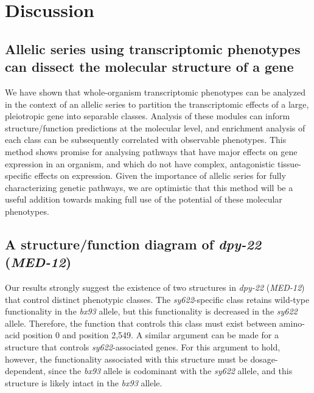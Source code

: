 \documentclass[10pt, twocolumn]{article}
\newcommand{\cel}{\emph{C.~elegans}}
\newcommand{\gene}[1]{\mbox{\emph{#1}}}
\newcommand{\dpy}{\gene{dpy-22} (\emph{MED-12})}
\begin{document}
%


\section*{Discussion}
\label{sec:conclusions}
\subsection*{Allelic series using transcriptomic phenotypes can dissect the
             molecular structure of a gene}
We have shown that whole-organism transcriptomic phenotypes can be analyzed in
the context of an allelic series to partition the transcriptomic effects of a
large, pleiotropic gene into separable classes. Analysis of these modules can
inform structure/function predictions at the molecular level, and enrichment
analysis of each class can be subsequently correlated with observable phenotypes.
This method shows promise for analysing pathways that have major effects on
gene expression in an organism, and which do not have complex, antagonistic
tissue-specific effects on expression. Given the importance of allelic series
for fully characterizing genetic pathways, we are optimistic that this method
will be a useful addition towards making full use of the potential of these
molecular phenotypes.

\subsection*{A structure/function diagram of \dpy{}}
Our results strongly suggest the existence of two structures in \dpy{} that
control distinct phenotypic classes. The \emph{sy622}-specific class retains
wild-type functionality in the \emph{bx93} allele, but this functionality is
decreased in the \emph{sy622} allele. Therefore, the function that controls this
class must exist between amino-acid position 0 and position 2,549. A similar
argument can be made for a structure that controls \emph{sy622}-associated
genes. For this argument to hold, however, the functionality associated with this
structure must be dosage-dependent, since the \emph{bx93} allele is codominant
with the \emph{sy622} allele, and this structure is likely intact in the
\emph{bx93} allele.
\end{document}

